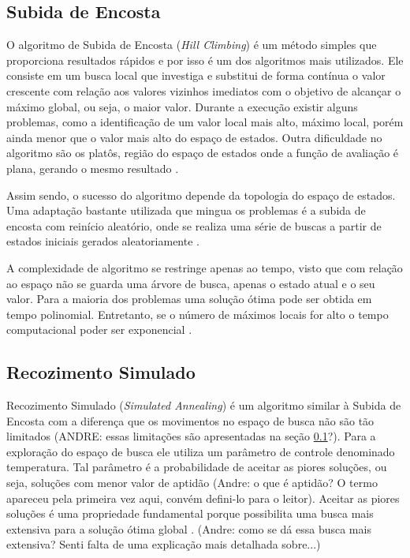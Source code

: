 \subsection{Subida de Encosta}
\label{sec:subidaDeEncosta}

O algoritmo de Subida de Encosta (\textit{Hill Climbing}) é um método simples que proporciona resultados rápidos e por isso é um dos algoritmos mais utilizados. Ele consiste em um busca local que investiga e substitui de forma contínua o valor crescente com relação aos valores vizinhos imediatos com o objetivo de alcançar o máximo global, ou seja, o maior valor. Durante a execução existir alguns problemas, como a identificação de um valor local mais alto, máximo local, porém ainda menor que o valor mais alto do espaço de estados. Outra dificuldade no algoritmo são os platôs, região do espaço de estados onde a função de avaliação é plana, gerando o mesmo resultado \cite{russell2016artificial}.

Assim sendo, o sucesso do algoritmo depende da topologia do espaço de estados. Uma adaptação bastante utilizada que mingua os problemas é a subida de encosta com reinício aleatório, onde se realiza uma série de buscas a partir de estados iniciais gerados aleatoriamente \cite{russell2016artificial}. 

A complexidade de algoritmo se restringe apenas ao tempo, visto que com relação ao espaço não se guarda uma árvore de busca, apenas o estado atual e o seu valor. Para a maioria dos problemas uma solução ótima pode ser obtida em tempo polinomial. Entretanto, se o número de máximos locais for alto o tempo computacional poder ser exponencial \cite{skiena1998algorithm}.

\subsection{Recozimento Simulado}
\label{sec:recozimentoSimulado}

Recozimento Simulado (\textit{Simulated Annealing}) é um algoritmo similar à Subida de Encosta com a diferença que os movimentos no espaço de busca não são tão limitados (ANDRE: essas limitações são apresentadas na seção \ref{sec:subidaDeEncosta}?). Para a exploração do espaço de busca ele utiliza um parâmetro de controle denominado temperatura. Tal parâmetro é a probabilidade de aceitar as piores soluções, ou seja, soluções com menor valor de aptidão (Andre: o que é aptidão? O termo apareceu pela primeira vez aqui, convém defini-lo para o leitor).  Aceitar as piores soluções é uma propriedade fundamental porque possibilita uma busca mais extensiva para a solução ótima global \cite{kirkpatrick1983optimization}. (Andre: como se dá essa busca mais extensiva? Senti falta de uma explicação mais detalhada sobre...)


